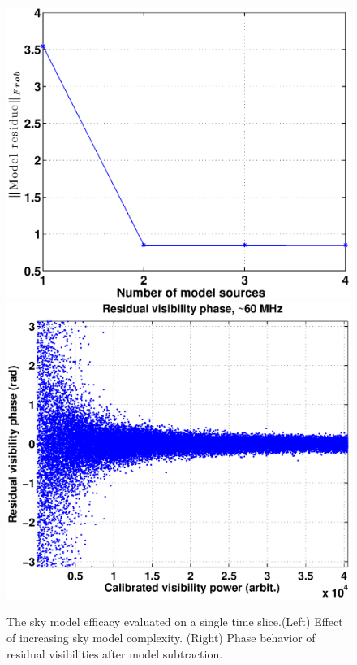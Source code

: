 \documentclass[referee]{aa}
\begin{document}
\begin{figure}[tbh]
\subfloat
  {\includegraphics[width=1\columnwidth]{Figs/model_efficacy.eps}}
\subfloat
  {\includegraphics[width=1\columnwidth]{Figs/selfcal_ph_behaviour_new.eps}}

\caption{\label{fig:The-model-amplitude}The  sky model  efficacy evaluated  on a
  single  time slice.(Left) Effect  of increasing  sky model  complexity. (Right)
  Phase behavior of residual visibilities after model subtraction.}
\end{figure}
\end{document}
